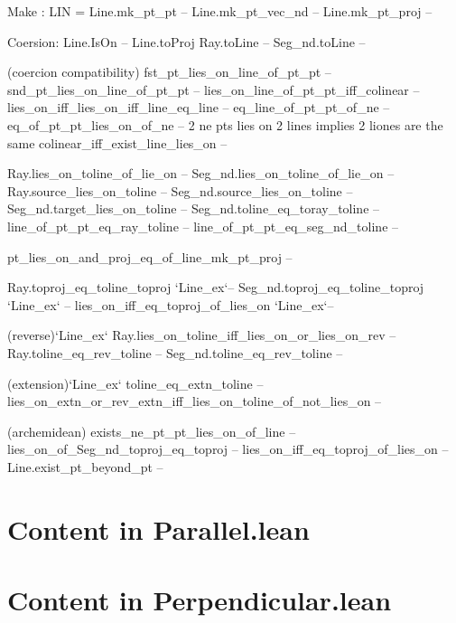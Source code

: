 \documentclass[12pt,a4paper]{article}
\begin{document}
  Make :
    LIN = Line.mk_pt_pt -- 
    Line.mk_pt_vec_nd --
    Line.mk_pt_proj --

  Coersion:
    Line.IsOn --
    Line.toProj
    Ray.toLine  --
    Seg_nd.toLine --

  (coercion compatibility)
    fst_pt_lies_on_line_of_pt_pt --
    snd_pt_lies_on_line_of_pt_pt --
    lies_on_line_of_pt_pt_iff_colinear --
    lies_on_iff_lies_on_iff_line_eq_line --
    eq_line_of_pt_pt_of_ne --
    eq_of_pt_pt_lies_on_of_ne -- 2 ne pts lies on 2 lines implies 2 liones are the same
    colinear_iff_exist_line_lies_on --

    Ray.lies_on_toline_of_lie_on --
    Seg_nd.lies_on_toline_of_lie_on --
    Ray.source_lies_on_toline --
    Seg_nd.source_lies_on_toline --
    Seg_nd.target_lies_on_toline --
    Seg_nd.toline_eq_toray_toline --
    line_of_pt_pt_eq_ray_toline --
    line_of_pt_pt_eq_seg_nd_toline --

    pt_lies_on_and_proj_eq_of_line_mk_pt_proj --

    Ray.toproj_eq_toline_toproj `Line_ex`--
    Seg_nd.toproj_eq_toline_toproj `Line_ex` --
    lies_on_iff_eq_toproj_of_lies_on `Line_ex`--

    (reverse)`Line_ex`
    Ray.lies_on_toline_iff_lies_on_or_lies_on_rev --
    Ray.toline_eq_rev_toline --
    Seg_nd.toline_eq_rev_toline --

    (extension)`Line_ex`
    toline_eq_extn_toline --
    lies_on_extn_or_rev_extn_iff_lies_on_toline_of_not_lies_on --

    (archemidean)
    exists_ne_pt_pt_lies_on_of_line --
    lies_on_of_Seg_nd_toproj_eq_toproj --
    lies_on_iff_eq_toproj_of_lies_on --
    Line.exist_pt_beyond_pt --
    

\section{Content in Parallel.lean}



\section{Content in Perpendicular.lean}
\end{document}
